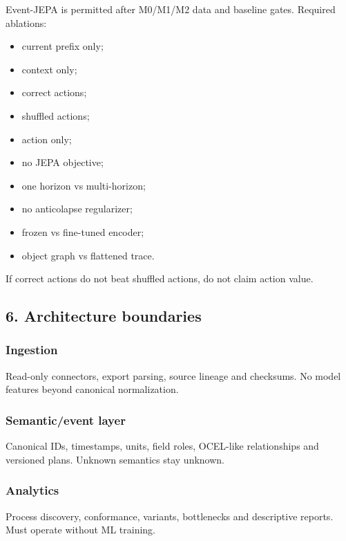 \documentclass[
  spanish,
  10pt,
  a4paper,
]{article}
\providecommand{\tightlist}{%
  \setlength{\itemsep}{0pt}\setlength{\parskip}{0pt}}
\begin{document}
Event-JEPA is permitted after M0/M1/M2 data and baseline gates. Required
ablations:

\begin{itemize}
\tightlist
\item
  current prefix only;
\item
  context only;
\item
  correct actions;
\item
  shuffled actions;
\item
  action only;
\item
  no JEPA objective;
\item
  one horizon vs multi-horizon;
\item
  no anticolapse regularizer;
\item
  frozen vs fine-tuned encoder;
\item
  object graph vs flattened trace.
\end{itemize}

If correct actions do not beat shuffled actions, do not claim action
value.

\subsection{6. Architecture boundaries}\label{6-architecture-boundaries}

\subsubsection{Ingestion}\label{ingestion}

Read-only connectors, export parsing, source lineage and checksums. No
model features beyond canonical normalization.

\subsubsection{Semantic/event layer}\label{semanticevent-layer}

Canonical IDs, timestamps, units, field roles, OCEL-like relationships
and versioned plans. Unknown semantics stay unknown.

\subsubsection{Analytics}\label{analytics}

Process discovery, conformance, variants, bottlenecks and descriptive
reports. Must operate without ML training.
\end{document}
